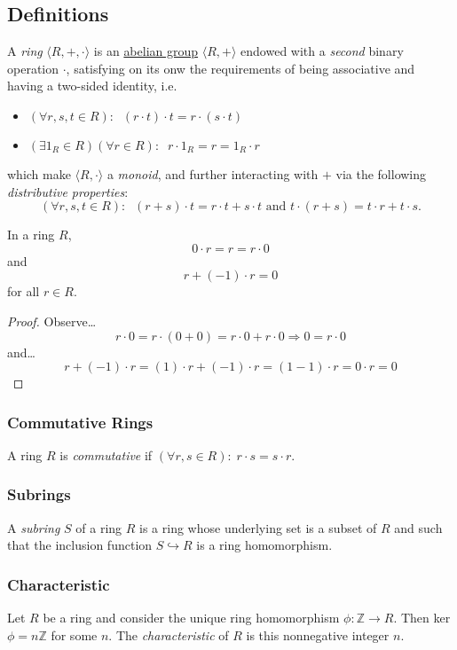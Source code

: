 \subsection{Definitions}\label{ringdefinition}
A \emph{ring} $\langle R, +, \cdot \rangle$ is an \hyperref[abeliangroupdefinition]{abelian group} $\langle R,+ \rangle$ endowed with a \emph{second}
binary operation $\cdot$, satisfying on its onw the requirements of being associative and having a two-sided identity, i.e.
\begin{itemize}
  \item $(\forall r,s,t \in R): \; \; (r \cdot t) \cdot t = r \cdot (s \cdot t)$
  \item $(\exists 1_R \in R) (\forall r \in R): \; \; r \cdot 1_R = r = 1_R \cdot r$
\end{itemize}
which make $\langle R, \cdot \rangle$ a \emph{monoid}, and further interacting with $+$ via the following \emph{distributive properties}:
$$(\forall r,s,t \in R): \; \; (r+s)\cdot t = r \cdot t + s \cdot t \textrm{ and } t \cdot (r + s) = t \cdot r + t \cdot s.$$

\begin{lemma}
In a ring $R$,
$$0 \cdot r = r = r \cdot 0$$
and
$$r + (-1) \cdot r = 0$$
for all $r \in R.$
\end{lemma}

\begin{proof}
Observe\dots
$$r \cdot 0 = r \cdot (0 + 0) = r \cdot 0 + r \cdot 0 \Rightarrow 0 = r \cdot 0$$
and\dots
$$r + (-1) \cdot r = (1) \cdot r + (-1) \cdot r = (1 - 1) \cdot r = 0 \cdot r = 0$$
\end{proof}

\subsubsection{Commutative Rings}\label{commutativeringdefinition}
A ring $R$ is \emph{commutative} if $(\forall r,s \in R): \; r \cdot s = s \cdot r$.

\subsubsection{Subrings}\label{subrings}
A \emph{subring} $S$ of a ring $R$ is a ring whose underlying set is a subset of $R$ and such that
the inclusion function $S \hookrightarrow R$ is a ring homomorphism.

\subsubsection{Characteristic}\label{characteristic}
Let $R$ be a ring and consider the unique ring homomorphism $\phi: \mathbb{Z} \rightarrow R$. Then ker$\phi = n\mathbb{Z}$
for some $n$. The \emph{characteristic} of $R$ is this nonnegative integer $n$.
